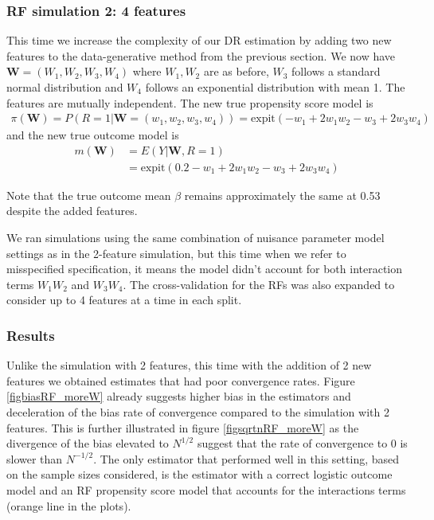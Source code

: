 \documentclass[12pt,twoside]{article}
\newcommand{\expit}{\text{expit}}
\begin{document}
\clearpage
\subsubsection{RF simulation 2: 4 features} \label{RF simu 2}

This time we increase the complexity of our DR estimation by adding two new features to the data-generative method from the previous section. We now have $\mathbf{W} = (W_1,W_2,W_3,W_4)$ where $W_1,W_2$ are as before, $W_3$ follows a standard normal distribution and $W_4$ follows an exponential distribution with mean 1. The features are mutually independent. The new true propensity score model is 
\begin{align*}
    \pi(\mathbf{W}) = P(R = 1 |\mathbf{W} = (w_1,w_2, w_3,w_4)) = \expit(-w_1 + 2w_1w_2 - w_3 + 2w_3w_4)
\end{align*}
and the new true outcome model is 
\begin{align*}
    m(\mathbf{W}) &= E(Y|\mathbf{W}, R=1) \\
    & = \expit(0.2 - w_1 + 2w_1w_2 - w_3 + 2w_3w_4)
\end{align*}

Note that the true outcome mean $\beta$ remains approximately the same at 0.53 despite the added features.

We ran simulations using the same combination of nuisance parameter model settings as in the 2-feature simulation, but this time when we refer to misspecified specification, it means the model didn't account for both interaction terms $W_1W_2$ and $W_3W_4$. The cross-validation for the RFs was also expanded to consider up to 4 features at a time in each split. 

\subsubsection*{Results}

Unlike the simulation with 2 features, this time with the addition of 2 new features we obtained estimates that had poor convergence rates. Figure \ref{figbiasRF_moreW} already suggests higher bias in the estimators and deceleration of the bias rate of convergence compared to the simulation with 2 features. This is further illustrated in figure \ref{figsqrtnRF_moreW} as the divergence of the bias elevated to $N^{1/2}$ suggest that the rate of convergence to 0 is slower than $N^{-1/2}$. The only estimator that performed well in this setting, based on the sample sizes considered, is the estimator with a correct logistic outcome model and an RF propensity score model that accounts for the interactions terms (orange line in the plots). 
\end{document}
